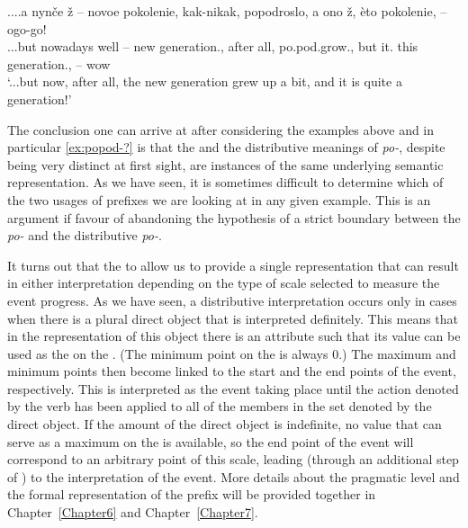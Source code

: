 \exg.\label{ex:popod-?}...a nyn\v{c}e \v{z} – novoe pokolenie, kak-nikak, popodroslo, a ono \v{z}, \`{e}to pokolenie, -- ogo-go!\\
...but nowadays well -- new generation., {after all}, po.pod.grow., but it. {} this generation., -- wow
\\
\trans `...but now, after all, the new generation grew up a bit, and it is quite a generation!'
 
The conclusion one can arrive at after considering the examples above and in particular \ref{ex:popod-?} is that the  and the distributive meanings of \textit{po-}, despite being very distinct at first sight, are instances of the same underlying semantic representation. As we have seen, it is sometimes difficult to determine which of the two usages of prefixes we are looking at in any given example. This is an argument if favour of abandoning the hypothesis of a strict boundary between the  \textit{po-} and the distributive \textit{po-}.

It turns out that the  to  allow us to provide a single representation that can result in either interpretation depending on the type of scale selected to measure the event progress. As we have seen, a distributive interpretation occurs only in cases when there is a plural direct object that is interpreted definitely. This means that in the representation of this object there is an attribute such that its value can be used as the  on the . (The minimum point on the  is always 0.) The maximum and minimum points then become linked to the start and the end points of the event, respectively. This is interpreted as the event taking place until the action denoted by the verb has been applied to all of the members in the set denoted by the direct object. If the amount of the direct object is indefinite, no value that can serve as a maximum on the  is available, so the end point of the event will correspond to an arbitrary point of this scale, leading (through an additional step of ) to the  interpretation of the event. More details about the pragmatic level and the formal representation of the prefix will be provided together in Chapter~\ref{Chapter6} and Chapter~\ref{Chapter7}.


